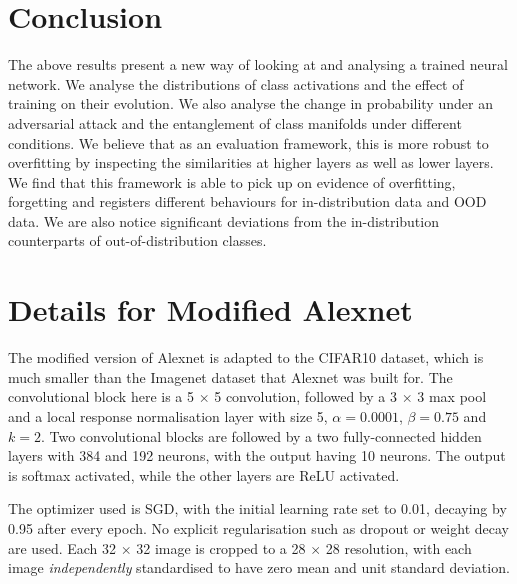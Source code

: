 \documentclass{article}
\begin{document}
    \section{Conclusion}
        The above results present a new way of looking at and analysing a trained neural network. We analyse the distributions of class activations and the effect of training on their evolution. We also analyse the change in probability under an adversarial attack and the entanglement of class manifolds under different conditions. We believe that as an evaluation framework, this is more robust to overfitting by inspecting the similarities at higher layers as well as lower layers. We find that this framework is able to pick up on evidence of overfitting, forgetting and registers different behaviours for in-distribution data and OOD data. We are also notice significant deviations from the in-distribution counterparts of out-of-distribution classes. 
    
    


    \appendix

    \section{Details for Modified Alexnet}
        The modified version of Alexnet is adapted to the CIFAR10 dataset, which is much smaller than the Imagenet dataset that Alexnet was built for. The convolutional block here is a 5 $\times$ 5 convolution, followed by a 3 $\times$ 3 max pool and a local response normalisation layer with size 5, $\alpha=0.0001$, $\beta=0.75$ and $k=2$. Two convolutional blocks are followed by a two fully-connected hidden layers with 384 and 192 neurons, with the output having 10 neurons. The output is softmax activated, while the other layers are ReLU activated.

        The optimizer used is SGD, with the initial learning rate set to 0.01, decaying by 0.95 after every epoch. No explicit regularisation such as dropout or weight decay are used. Each 32 $\times$ 32 image is cropped to a 28 $\times$ 28 resolution, with each image \textit{independently} standardised to have zero mean and unit standard deviation.

\end{document}
